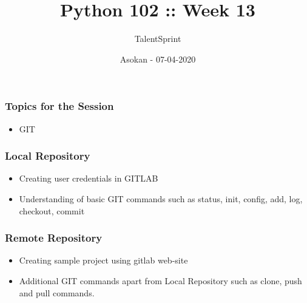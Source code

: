 \documentclass[14pt]{beamer}
\title{Python 102 :: Week 13}
\date{Asokan - 07-04-2020}
\author[TS]{TalentSprint}
\begin{document}
 
    \begin{frame}
        \titlepage
    \end{frame}
    \begin{frame}
        \frametitle{Topics for the Session}
        \begin{itemize}
            \item GIT
        \end{itemize}
    \end{frame}

    \begin{frame}
        \frametitle{Local Repository}
        \begin{itemize}
        	\item Creating user credentials in GITLAB
            \item Understanding of basic GIT commands such as status, init, config, add, log, checkout, commit 
        \end{itemize}
    \end{frame}

    \begin{frame}
        \frametitle{Remote Repository}
        \begin{itemize}
        	\item Creating sample project using gitlab web-site
            \item Additional GIT commands apart from Local Repository such as clone, push and pull commands.
        \end{itemize}
    \end{frame}
\end{document}
